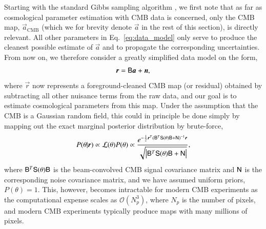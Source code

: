 \documentclass[twocolumn]{../common/aa}
\newcommand{\B}[0]{\tens{B}}
\newcommand{\n}[0]{\vec{n}}
\renewcommand{\a}[0]{\vec{a}}
\newcommand{\N}[0]{\tens{N}}
\renewcommand{\S}[0]{\tens{S}}
\renewcommand{\r}[0]{\vec{r}}
\begin{document}
Starting with the standard Gibbs sampling algorithm \citep{jewell2004,wandelt2004}, we first note that as far as cosmological parameter estimation with CMB data is concerned, only the CMB map, $\a_{\mathrm{CMB}}$ (which we for brevity denote $\a$ in the rest of this section), is directly relevant. All other parameters in Eq.~\eqref{eq:data_model} only serve to produce the cleanest possible estimate of $\a$ and to propagate the corresponding uncertainties. From now on, we therefore consider a greatly simplified data model on the form,
\begin{equation}
  \r = \B\a + \n,
\end{equation}
where $\r$ now represents a foreground-cleaned CMB map (or residual) obtained by subtracting all other nuisance terms from the raw data, and our goal is to estimate cosmological parameters from this map. Under the assumption that the CMB is a Gaussian random field, this could in principle be done simply by mapping out the exact marginal posterior distribution by brute-force,
\begin{equation}
  P(\theta | \r) \propto \mathcal{L}(\theta)P(\theta) \propto \frac{e^{-\frac12 \r^T (\B^T \S(\theta) \B + \N)^{-1}\r}}{\sqrt{\left|\B^T \S(\theta) \B + \N\right|}},
  \label{eq:exact_posterior}
\end{equation}
where $\B^T \S(\theta) \B$ is the beam-convolved CMB signal covariance matrix and $\N$ is the corresponding noise covariance matrix, and we have assumed uniform priors, $P(\theta) = 1$. This, however, becomes intractable for modern CMB experiments as the computational expense scales as $\mathcal{O}(N_p^3)$, where $N_p$ is the number of pixels, and modern CMB experiments typically produce maps with many millions of pixels. 
\end{document}
